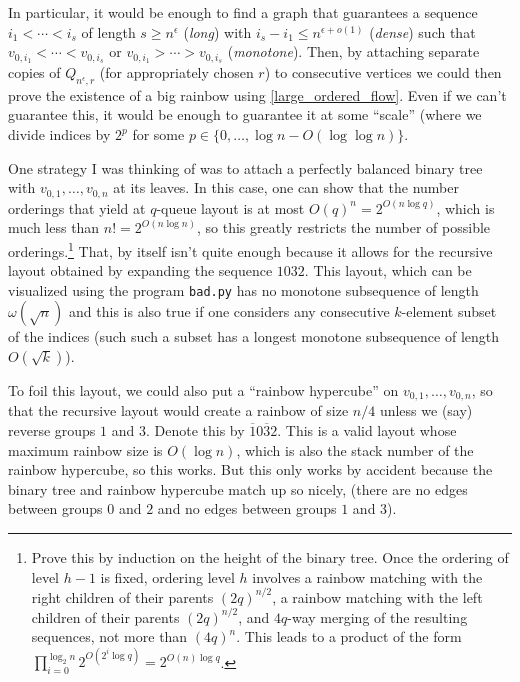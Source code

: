 \documentclass{patmorin}
\begin{document}
In particular, it would be enough to find a graph that guarantees a sequence $i_1<\cdots<i_s$ of length $s\ge  n^\epsilon$ (\emph{long}) with $i_s-i_1 \le n^{\epsilon+o(1)}$ (\emph{dense}) such that $v_{0,i_1}<\cdots<v_{0,i_s}$ or $v_{0,i_1}>\cdots>v_{0,i_s}$ (\emph{monotone}). Then, by attaching separate copies of $Q_{n^{\epsilon},r}$ (for appropriately chosen $r$) to consecutive vertices we could then prove the existence of a big rainbow using \cref{large_ordered_flow}. Even if we can't guarantee this, it would be enough to guarantee it at some ``scale'' (where we divide indices by $2^p$ for some $p\in \{0,\ldots,\log n- O(\log\log n)\}$.

One strategy I was thinking of was to attach a perfectly balanced binary tree with $v_{0,1},\ldots,v_{0,n}$ at its leaves. In this case, one can show that the number orderings that yield at $q$-queue layout is at most $O(q)^n=2^{O(n\log q)}$, which is much less than $n!=2^{O(n\log n)}$, so this greatly restricts the number of possible orderings.\footnote{Prove this by induction on the height of the binary tree.  Once the ordering of level $h-1$ is fixed, ordering level $h$ involves a rainbow matching with the right children of their parents $(2q)^{n/2}$, a rainbow matching with the left children of their parents $(2q)^{n/2}$, and $4q$-way merging of the resulting sequences, not more than $(4q)^n$.  This leads to a product of the form $\prod_{i=0}^{\log_2 n} 2^{O(2^i\log q)}=2^{O(n)\log q}$.}  That, by itself isn't quite enough because it allows for the recursive layout obtained by expanding the sequence $1032$.  This layout, which can be visualized using the program \verb+bad.py+ has no monotone subsequence of length $\omega(\sqrt{n})$ and this is also true if one considers any consecutive $k$-element subset of the indices (such such a subset has a longest monotone subsequence of length $O(\sqrt{k})$).

To foil this layout, we could also put a ``rainbow hypercube'' on $v_{0,1},\ldots,v_{0,n}$, so that the recursive layout would create a rainbow of size $n/4$ unless we (say) reverse groups $1$ and $3$.  Denote this by $\overline{1}0\overline{3}2$.  This is a valid layout whose maximum rainbow size is $O(\log n)$, which is also the stack number of the rainbow hypercube, so this works.  But this only works by accident because the binary tree and rainbow hypercube match up so nicely, (there are no edges between groups $0$ and $2$ and no edges between groups $1$ and $3$).
\end{document}
